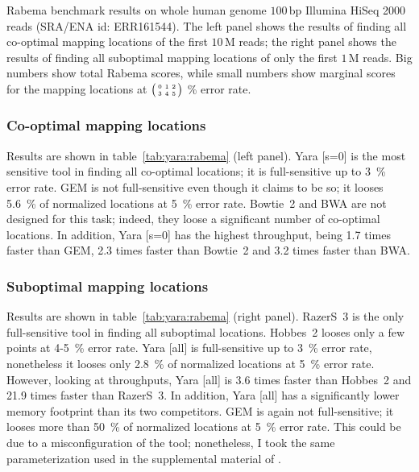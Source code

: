 \begin{table*}[t]
  \caption[Yara results in the Rabema benchmark]
  {
  \label{tab:yara:rabema}
    Rabema benchmark results on whole human genome $100\,\text{bp}$ Illumina HiSeq 2000 reads (SRA/ENA id: ERR161544).
    The left panel shows the results of finding all co-optimal mapping locations of the first $10\,\text{M}$ reads; the right panel shows the results of finding all suboptimal mapping locations of only the first $1\,\text{M}$ reads.
    Big numbers show total Rabema scores, while small numbers show marginal scores for the mapping locations at
    $\bigl(\begin{smallmatrix}\mbox{\tiny 0}&\mbox{\tiny 1}&\mbox{\tiny 2}\\\mbox{\tiny 3}&\mbox{\tiny 4}&\mbox{\tiny 5}\end{smallmatrix}\bigr)$ \% error rate.
    }
  \vspace{-3mm}
  \center
  \sffamily
  \resizebox{0.99\textwidth}{!}
  {
	\renewcommand{\tabcolsep}{0.8ex}
	
	
  }
\end{table*}

\subsubsection{Co-optimal mapping locations}
Results are shown in table~\ref{tab:yara:rabema} (left panel).
Yara [s=0] is the most sensitive tool in finding all co-optimal locations; it is full-sensitive up to 3~\% error rate.
GEM is not full-sensitive even though it claims to be so; it looses 5.6~\% of normalized locations at 5~\% error rate.
Bowtie~2 and BWA are not designed for this task; indeed, they loose a significant number of co-optimal locations.
In addition, Yara [s=0] has the highest throughput, being 1.7 times faster than GEM, 2.3 times faster than Bowtie~2 and 3.2 times faster than BWA.

\subsubsection{Suboptimal mapping locations}
Results are shown in table~\ref{tab:yara:rabema}  (right panel).
RazerS~3 is the only full-sensitive tool in finding all suboptimal locations.
Hobbes~2 looses only a few points at 4-5~\% error rate.
Yara [all] is full-sensitive up to 3~\% error rate, nonetheless it looses only 2.8~\% of normalized locations at 5~\% error rate.
However, looking at throughputs, Yara [all] is 3.6 times faster than Hobbes~2 and 21.9 times faster than RazerS~3.
In addition, Yara [all] has a significantly lower memory footprint than its two competitors.
GEM is again not full-sensitive; it looses more than 50~\% of normalized locations at 5~\% error rate.
This could be due to a misconfiguration of the tool; nonetheless, I took the same parameterization used in the supplemental material of \citep{MarcoSola2012}.

